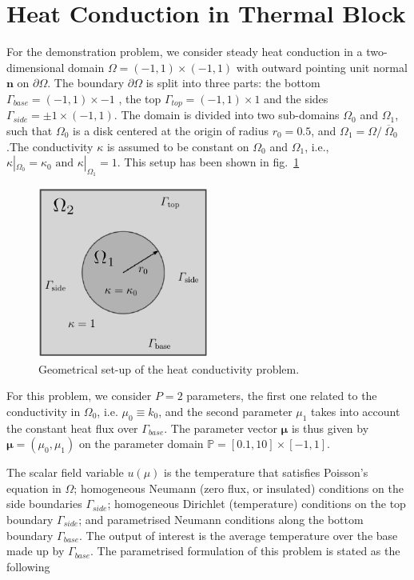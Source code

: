 \documentclass[11pt, oneside]{article}
\begin{document}
\section{Heat Conduction in Thermal Block}
For the demonstration problem, we consider steady heat conduction in a two-dimensional domain $ \Omega = (-1,1) \times (-1,1)$ with outward pointing unit normal $\mathbf{n}$ on $\partial \Omega$. The boundary $\partial \Omega$ is split into three parts: the bottom $\Gamma_{base} = (-1,1) \times {-1}$ , the top $\Gamma_{top} = (-1,1) \times {1}$ and the sides $\Gamma_{side} = {\pm 1} \times (-1,1)$. The domain is divided into two sub-domains  $\Omega_0$ and $\Omega_1$, such that $\Omega_0$ is a disk centered at the origin of radius $r_0=0.5$, and $\Omega_1=\Omega/\ \overline{\Omega}_0$.The conductivity $\kappa$ is assumed to be constant on $\Omega_0$ and $\Omega_1$, i.e., $\kappa|_{\Omega_0}=\kappa_0 \text{ and } \kappa|_{\Omega_1}=1$. This setup has been shown in fig.~\ref{fig:1}
    \begin{figure}
        \centering
        \includegraphics[width=0.5\textwidth]{figures/thermal_block.png}
        \caption{Geometrical set-up of the heat conductivity problem.}
        \label{fig:1}
    \end{figure}

For this problem, we consider $P=2$ parameters, the first one related to the conductivity in $\Omega_0$, i.e. $\mu_0\equiv k_0$, and the second parameter $\mu_1$ takes into account the constant heat flux over $\Gamma_{base}$. The parameter vector $\boldsymbol{\mu}$ is thus given by $\boldsymbol{\mu} = (\mu_0,\mu_1)$ on the parameter domain $\mathbb{P}=[0.1,10]\times[-1,1]$.

The scalar field variable $u(\mu)$ is the temperature that satisfies Poisson's equation in $\Omega$; homogeneous Neumann (zero flux, or insulated) conditions on the side boundaries $\Gamma_{side}$; homogeneous Dirichlet (temperature) conditions on the top boundary $\Gamma_{side}$; and parametrised Neumann conditions along the bottom boundary $\Gamma_{base}$. The output of interest is the average temperature over the base made up by $\Gamma_{base}$. The parametrised formulation of this problem is stated as the following
\end{document}
